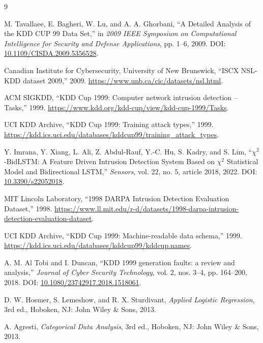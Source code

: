 \begin{thebibliography}{9}

M. Tavallaee, E. Bagheri, W. Lu, and A. A. Ghorbani,
``A Detailed Analysis of the KDD CUP 99 Data Set,''
in \emph{2009 IEEE Symposium on Computational Intelligence for Security and Defense Applications},
pp. 1--6, 2009. DOI: \href{https://doi.org/10.1109/CISDA.2009.5356528}{10.1109/CISDA.2009.5356528}.

Canadian Institute for Cybersecurity, University of New Brunswick,
``ISCX NSL-KDD dataset 2009,'' 2009.
\url{https://www.unb.ca/cic/datasets/nsl.html}.

ACM SIGKDD,
``KDD Cup 1999: Computer network intrusion detection -- Tasks,'' 1999.
\url{https://www.kdd.org/kdd-cup/view/kdd-cup-1999/Tasks}.

UCI KDD Archive,
``KDD Cup 1999: Training attack types,'' 1999.
\url{https://kdd.ics.uci.edu/databases/kddcup99/training_attack_types}.

Y. Imrana, Y. Xiang, L. Ali, Z. Abdul-Rauf, Y.-C. Hu, S. Kadry, and S. Lim,
``$\chi^2$-BidLSTM: A Feature Driven Intrusion Detection System Based on $\chi^2$ Statistical Model and Bidirectional LSTM,''
\emph{Sensors}, vol. 22, no. 5, article 2018, 2022.
DOI: \href{https://doi.org/10.3390/s22052018}{10.3390/s22052018}.

MIT Lincoln Laboratory,
``1998 DARPA Intrusion Detection Evaluation Dataset,'' 1998.
\url{https://www.ll.mit.edu/r-d/datasets/1998-darpa-intrusion-detection-evaluation-dataset}.

UCI KDD Archive,
``KDD Cup 1999: Machine-readable data schema,'' 1999.
\url{https://kdd.ics.uci.edu/databases/kddcup99/kddcup.names}.

A. M. Al Tobi and I. Duncan,
``KDD 1999 generation faults: a review and analysis,''
\emph{Journal of Cyber Security Technology}, vol. 2, nos. 3--4, pp. 164--200, 2018.
DOI: \href{https://doi.org/10.1080/23742917.2018.1518061}{10.1080/23742917.2018.1518061}.

D. W. Hosmer, S. Lemeshow, and R. X. Sturdivant,
\emph{Applied Logistic Regression}, 3rd ed.,
Hoboken, NJ: John Wiley \& Sons, 2013.

A. Agresti,
\emph{Categorical Data Analysis}, 3rd ed.,
Hoboken, NJ: John Wiley \& Sons, 2013.


\end{thebibliography}
